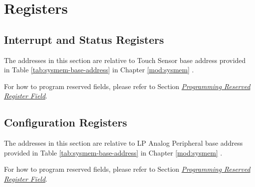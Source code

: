\documentclass[main\_\_EN.tex]{subfiles}
\begin{document}
\newpage
\section{Registers}

\subsection{Interrupt and Status Registers}
\label{sec:tchsen-status-reg}

The addresses in this section are relative to Touch Sensor base address provided in Table \ref{tab:sysmem-base-address} in Chapter \ref{mod:sysmem} \textit{}.

For how to program reserved fields, please refer to Section \hyperref[programming-reserved-field]{\textit{Programming Reserved Register Field}}.



\subsection{Configuration Registers}
\label{sec:tchsen-config-reg}

The addresses in this section are relative to LP Analog Peripheral base address provided in Table \ref{tab:sysmem-base-address} in Chapter \ref{mod:sysmem} \textit{}.

For how to program reserved fields, please refer to Section \hyperref[programming-reserved-field]{\textit{Programming Reserved Register Field}}.


\end{document}
